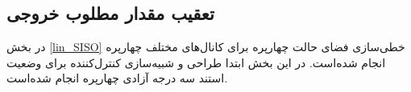 \documentclass{CCI2020}
\begin{document}
	\subsection{تعقیب مقدار مطلوب خروجی}\label{3dof_regulator}
	
	
	در بخش
	\ref{lin_SISO}
	خطی‌سازی فضای حالت چهارپره برای کانال‌های مختلف چهارپره انجام شده‌است. در این بخش ابتدا طراحی و شبیه‌سازی کنترل‌کننده برای وضعیت استند سه درجه آزادی چهارپره انجام شده‌است.
	
\end{document}
